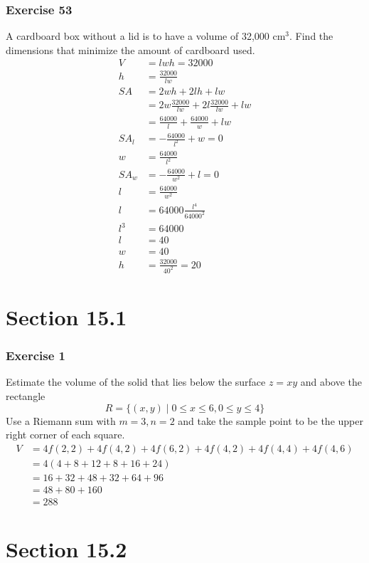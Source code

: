 \documentclass{math}
\begin{document}
\subsubsection*{Exercise 53}
A cardboard box without a lid is to have a volume of 32,000 \( \text{cm}^3 \).
Find the dimensions that minimize the amount of cardboard used.
\begin{align*}
  V &= lwh = 32000 \\
  h &= \frac{32000}{lw} \\
  SA &= 2wh+2lh+lw \\
  &= 2w\frac{32000}{lw}+2l\frac{32000}{lw}+lw \\
  &= \frac{64000}{l}+\frac{64000}{w}+lw \\
  SA_l &= -\frac{64000}{l^2}+w = 0 \\
  w &= \frac{64000}{l^2} \\
  SA_w &= -\frac{64000}{w^2}+l = 0 \\
  l &= \frac{64000}{w^2} \\
  l &= 64000\frac{l^4}{64000^2} \\
  l^3 &= 64000 \\
  l &= 40 \\
  w &= 40 \\
  h &= \frac{32000}{40^2} = 20
\end{align*}

\section*{Section 15.1}

\subsubsection*{Exercise 1}
Estimate the volume of the solid that lies below the surface \( z = xy \) and
above the rectangle
\[ R = \{(x,y)\mid0\le x\le6,0\le y\le4\} \]
Use a Riemann sum with \( m = 3, n = 2 \) and take the sample point to be the
upper right corner of each square.
\begin{align*}
  V &= 4f(2,2)+4f(4,2)+4f(6,2)+4f(4,2)+4f(4,4)+4f(4,6) \\
  &= 4(4+8+12+8+16+24) \\
  &= 16+32+48+32+64+96 \\
  &= 48+80+160 \\
  &= 288
\end{align*}

\section*{Section 15.2}
\end{document}
